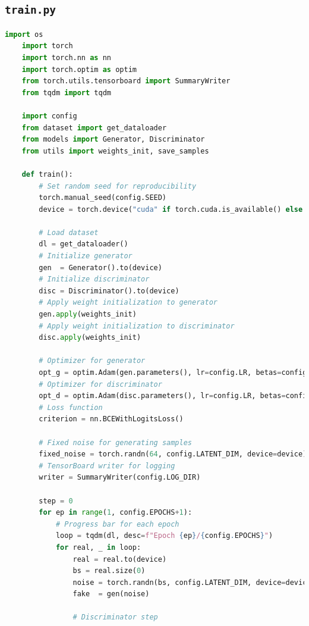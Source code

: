 \documentclass[11pt]{article}
\begin{document}
\subsection{\texttt{train.py}}
\begin{lstlisting}[language=Python, caption={Training Loop}, label={lst:config}, frame=single, basicstyle=\ttfamily\small, keywordstyle=\color{blue}\bfseries, commentstyle=\color{green!50!black}, stringstyle=\color{red!70!black}]
    import os
    import torch
    import torch.nn as nn
    import torch.optim as optim
    from torch.utils.tensorboard import SummaryWriter
    from tqdm import tqdm
    
    import config
    from dataset import get_dataloader
    from models import Generator, Discriminator
    from utils import weights_init, save_samples
    
    def train():
        # Set random seed for reproducibility
        torch.manual_seed(config.SEED)  
        device = torch.device("cuda" if torch.cuda.is_available() else "cpu")  
    
        # Load dataset
        dl = get_dataloader()  
        # Initialize generator
        gen  = Generator().to(device)  
        # Initialize discriminator
        disc = Discriminator().to(device)  
        # Apply weight initialization to generator
        gen.apply(weights_init)  
        # Apply weight initialization to discriminator
        disc.apply(weights_init)  
    
        # Optimizer for generator
        opt_g = optim.Adam(gen.parameters(), lr=config.LR, betas=config.BETAS)  
        # Optimizer for discriminator
        opt_d = optim.Adam(disc.parameters(), lr=config.LR, betas=config.BETAS)  
        # Loss function
        criterion = nn.BCEWithLogitsLoss()  
    
        # Fixed noise for generating samples
        fixed_noise = torch.randn(64, config.LATENT_DIM, device=device)  
        # TensorBoard writer for logging
        writer = SummaryWriter(config.LOG_DIR)  
    
        step = 0
        for ep in range(1, config.EPOCHS+1):
            # Progress bar for each epoch
            loop = tqdm(dl, desc=f"Epoch {ep}/{config.EPOCHS}")  
            for real, _ in loop:
                real = real.to(device)
                bs = real.size(0)
                noise = torch.randn(bs, config.LATENT_DIM, device=device)
                fake  = gen(noise)
    
                # Discriminator step
                

\end{lstlisting}
\end{document}
